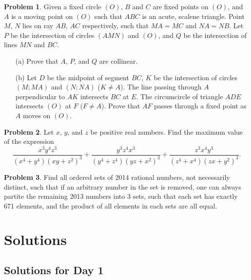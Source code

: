 \documentclass[11pt]{article}
\theoremstyle{definition}
\newtheorem{exercise}{Problem}
\newcommand{\boom}{\vspace{0.25cm}}
\begin{document}
        \begin{exercise}
            Given a fixed circle \((O)\), \(B\) and \(C\) are fixed points on \((O)\), and \(A\) is a moving point on \((O)\) such that \(ABC\) is an acute, scalene triangle. Point \(M\), \(N\) lies on ray \(AB\), \(AC\) respectively, such that \(MA = MC\) and \(NA = NB\). Let \(P\) be the intersection of circles \((AMN)\) and \((O)\), and \(Q\) be the intersection of lines \(MN\) and \(BC\).
            \begin{enumerate}
                \item[(a)] Prove that \(A\), \(P\), and \(Q\) are collinear.
                \item[(b)] Let \(D\) be the midpoint of segment \(BC\), \(K\) be the intersection of circles \((M;MA)\) and \((N;NA)\) (\(K \neq A\)). The line passing through \(A\) perpendicular to \(AK\) intersects \(BC\) at \(E\). The circumcircle of triangle \(ADE\) intersects \((O)\) at \(F\) (\(F \neq A\)). Prove that \(AF\) passes through a fixed point as \(A\) moves on \((O)\).
            \end{enumerate}
        \end{exercise}
    
        \boom
    
        \begin{exercise}
            Let \(x\), \(y\), and \(z\) be positive real numbers. Find the maximum value of the expression
            \[\frac{x^3y^4z^3}{(x^4 + y^4)(xy + z^2)^3} + \frac{y^3z^4x^3}{(y^4 + z^4)(yz + x^2)^3} + \frac{z^3x^4y^3}{(z^4 + x^4)(zx + y^2)^3}.\]
        \end{exercise}
    
        \boom
    
        \begin{exercise}
            Find all ordered sets of 2014 rational numbers, not necessarily distinct, such that if an arbitrary number in the set is removed, one can always partite the remaining 2013 numbers into 3 sets, such that each set has exactly 671 elements, and the product of all elements in each sets are all equal.
        \end{exercise}

    \newpage

\section{Solutions}

    \subsection{Solutions for Day 1}
\end{document}
